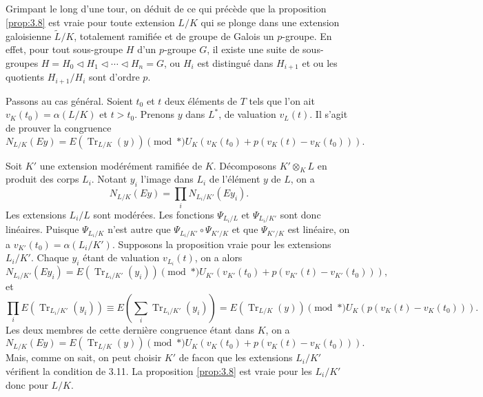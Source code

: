 \documentclass[12pt,a4paper]{article}
\theoremstyle{plain}
\theoremstyle{definition}
\theoremstyle{remark}
\DeclareMathOperator{\Tr}{Tr}
\providecommand{\Tr}{\operatorname{Tr}}
\begin{document}
\subsection{}
\label{sec:3.11}

Grimpant le long d'une tour, on d\'eduit de ce qui pr\'ec\`ede que la proposition \ref{prop:3.8} est vraie pour toute extension $L/K$ qui se plonge dans une extension galoisienne $\tilde{L}/K$, totalement ramifi\'ee et de groupe de Galois un $p$-groupe. En effet, pour tout sous-groupe $H$ d'un $p$-groupe $G$, il existe une suite de sous-groupes $H = H_0 \triangleleft H_1 \triangleleft \cdots \triangleleft H_n = G$, ou $H_i$ est distingu\'e dans $H_{i+1}$ et ou les quotients $H_{i+1}/H_i$ sont d'ordre $p$.

Passons au cas g\'en\'eral. Soient $t_0$ et $t$ deux \'el\'ements de $T$ tels que l'on ait $v_K(t_0) = \alpha(L/K)$ et $t > t_0$. Prenons $y$ dans $L^*$, de valuation $v_L(t)$. Il s'agit de prouver la congruence
\[
N_{L/K}(Ey) = E(\Tr_{L/K}(y)) \pmod{*} U_K(v_K(t_0) + p(v_K(t) - v_K(t_0))).
\]

Soit $K'$ une extension mod\'er\'ement ramifi\'ee de $K$. D\'ecomposons $K' \otimes_K L$ en produit des corps $L_i$. Notant $y_i$ l'image dans $L_i$ de l'\'el\'ement $y$ de $L$, on a
\[
N_{L/K}(Ey) = \prod_i N_{L_i/K'}(Ey_i).
\]
Les extensions $L_i/L$ sont mod\'er\'ees. Les fonctions $\Psi_{L_i/L}$ et $\Psi_{L_i/K'}$ sont donc lin\'eaires. Puisque $\Psi_{L_i/K}$ n'est autre que $\Psi_{L_i/K'} \circ \Psi_{K'/K}$ et que $\Psi_{K'/K}$ est lin\'eaire, on a $v_{K'}(t_0) = \alpha(L_i/K')$. Supposons la proposition vraie pour les extensions $L_i/K'$. Chaque $y_i$ \'etant de valuation $v_{L_i}(t)$, on a alors
\[
N_{L_i/K'}(Ey_i) = E(\Tr_{L_i/K'}(y_i)) \pmod{*} U_{K'}(v_{K'}(t_0) + p(v_{K'}(t) - v_{K'}(t_0))),
\]
et
\[
\prod_i E(\Tr_{L_i/K'}(y_i)) \equiv E(\sum_i \Tr_{L_i/K'}(y_i)) = E(\Tr_{L/K}(y)) \pmod{*} U_K(p(v_K(t) - v_K(t_0))).
\]
Les deux membres de cette derni\`ere congruence \'etant dans $K$, on a
\[
N_{L/K}(Ey) = E(\Tr_{L/K}(y)) \pmod{*} U_K(v_K(t_0) + p(v_K(t) - v_K(t_0))).
\]
Mais, comme on sait, on peut choisir $K'$ de facon que les extensions $L_i/K'$ v\'erifient la condition de 3.11. La proposition \ref{prop:3.8} est vraie pour les $L_i/K'$ donc pour $L/K$.
\end{document}
